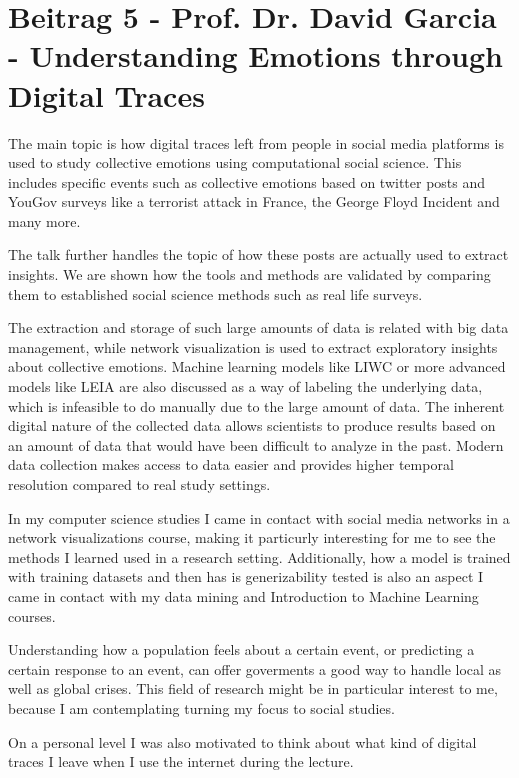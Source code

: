 \section*{Beitrag 5 - Prof. Dr. David Garcia - 
Understanding Emotions through Digital Traces}

The main topic is how digital traces left from people in social media platforms is used to study collective emotions using computational social science.
This includes specific events such as collective emotions based on twitter posts and YouGov surveys like a terrorist attack in France, the George Floyd Incident and many more.

The talk further handles the topic of how these posts are actually used to extract insights. We are shown how the tools and methods are validated by comparing them to established social science methods such as real life surveys.

The extraction and storage of such large amounts of data is related with big data management, while network visualization is used to extract exploratory insights about
collective emotions. 
Machine learning models like LIWC or more advanced models like LEIA are also discussed as a way of labeling the underlying data, which is infeasible to do manually due to the large amount of data.
The inherent digital nature of the collected data allows scientists to produce results based on an amount of data that would have been difficult to analyze in the past. 
Modern data collection makes access to data easier and provides higher temporal resolution compared to real study settings.

In my computer science studies I came in contact with social media networks in a network visualizations course, making it particurly interesting for me to see the methods I learned used in a research setting.
Additionally, how a model is trained with training datasets and then has is generizability tested is also an aspect I came in contact with my data mining and Introduction to Machine Learning courses.

Understanding how a population feels about a certain event, or predicting a certain response to an event, can offer goverments a good way to handle local as well as global crises. 
This field of research might be in particular interest to me, because I am contemplating turning my focus to social studies. 

On a personal level I was also motivated to think about what kind of digital traces I leave when I use the internet during the lecture.
